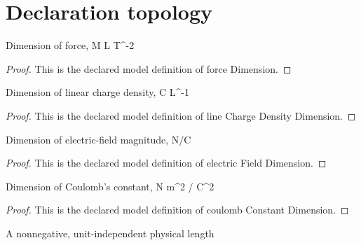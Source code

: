 \section{Declaration topology}
\begin{definition}
  \label{def:physics:phyx-mini-0839:phyxminiproblems-problemphyxmini0839-forcedimension}
  Dimension of force, M L T\textasciicircum{}-2
\end{definition}
\begin{proof}
  This is the declared model definition of force Dimension.
\end{proof}
\begin{definition}
  \label{def:physics:phyx-mini-0839:phyxminiproblems-problemphyxmini0839-linechargedensitydimension}
  Dimension of linear charge density, C L\textasciicircum{}-1
\end{definition}
\begin{proof}
  This is the declared model definition of line Charge Density Dimension.
\end{proof}
\begin{definition}
  \label{def:physics:phyx-mini-0839:phyxminiproblems-problemphyxmini0839-electricfielddimension}
  Dimension of electric-field magnitude, N/C
\end{definition}
\begin{proof}
  This is the declared model definition of electric Field Dimension.
\end{proof}
\begin{definition}
  \label{def:physics:phyx-mini-0839:phyxminiproblems-problemphyxmini0839-coulombconstantdimension}
  Dimension of Coulomb's constant, N m\textasciicircum{}2 / C\textasciicircum{}2
\end{definition}
\begin{proof}
  This is the declared model definition of coulomb Constant Dimension.
\end{proof}
\begin{definition}
  \label{def:physics:phyx-mini-0839:phyxminiproblems-problemphyxmini0839-lengthquantity}
  A nonnegative, unit-independent physical length
\end{definition}

